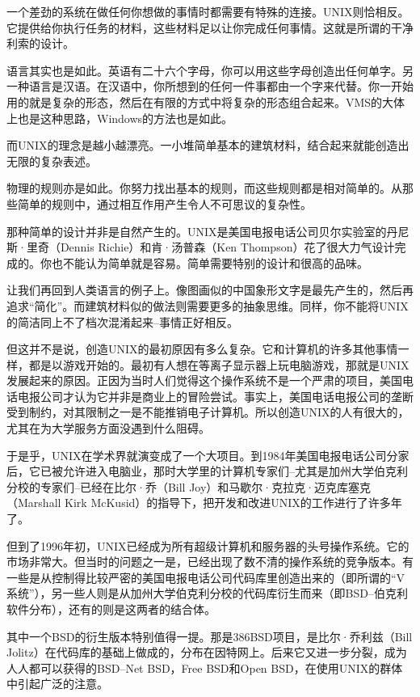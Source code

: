 一个差劲的系统在做任何你想做的事情时都需要有特殊的连接。UNIX则恰相反。它提供给你执行任务的材料，这些材料足以让你完成任何事情。这就是所谓的干净利索的设计。

语言其实也是如此。英语有二十六个字母，你可以用这些字母创造出任何单字。另一种语言是汉语。在汉语中，你所想到的任何一件事都由一个字来代替。你一开始用的就是复杂的形态，然后在有限的方式中将复杂的形态组合起来。VMS的大体上也是这种思路，Windows的方法也是如此。

而UNIX的理念是越小越漂亮。一小堆简单基本的建筑材料，结合起来就能创造出无限的复杂表述。

物理的规则亦是如此。你努力找出基本的规则，而这些规则都是相对简单的。从那些简单的规则中，通过相互作用产生令人不可思议的复杂性。

那种简单的设计并非是自然产生的。UNIX是美国电报电话公司贝尔实验室的丹尼斯·里奇（Dennis Richie）和肯·汤普森（Ken Thompson）花了很大力气设计完成的。你也不能认为简单就是容易。简单需要特别的设计和很高的品味。

让我们再回到人类语言的例子上。像图画似的中国象形文字是最先产生的，然后再追求“简化”。而建筑材料似的做法则需要更多的抽象思维。同样，你不能将UNIX的简洁同上不了档次混淆起来--事情正好相反。

但这并不是说，创造UNIX的最初原因有多么复杂。它和计算机的许多其他事情一样，都是以游戏开始的。最初有人想在等离子显示器上玩电脑游戏，那就是UNIX发展起来的原因。正因为当时人们觉得这个操作系统不是一个严肃的项目，美国电话电报公司才认为它并非是商业上的冒险尝试。事实上，美国电话电报公司的垄断受到制约，对其限制之一是不能推销电子计算机。所以创造UNIX的人有很大的，尤其在为大学服务方面没遇到什么阻碍。

于是乎，UNIX在学术界就演变成了一个大项目。到1984年美国电报电话公司分家后，它已被允许进入电脑业，那时大学里的计算机专家们--尤其是加州大学伯克利分校的专家们--已经在比尔·乔（Bill Joy）和马歇尔·克拉克·迈克库塞克（Marshall Kirk McKusid）的指导下，把开发和改进UNIX的工作进行了许多年了。

但到了1996年初，UNIX已经成为所有超级计算机和服务器的头号操作系统。它的市场非常大。但当时的问题之一是，已经出现了数不清的操作系统的竞争版本。有一些是从控制得比较严密的美国电报电话公司代码库里创造出来的（即所谓的“V系统”），另一些人则是从加州大学伯克利分校的代码库衍生而来（即BSD--伯克利软件分布），还有的则是这两者的结合体。

其中一个BSD的衍生版本特别值得一提。那是386BSD项目，是比尔·乔利兹（Bill Jolitz）在代码库的基础上做成的，分布在因特网上。后来它又进一步分裂，成为人人都可以获得的BSD--Net BSD，Free BSD和Open BSD，在使用UNIX的群体中引起广泛的注意。

